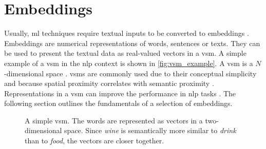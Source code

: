 \section{Embeddings}\label{sec:embeddings}

Usually, \ac{ml} techniques require textual inputs to be converted to embeddings \cite{SentRep2014}.
Embeddings are numerical representations of words, sentences or texts.
They can be used to present the textual data as real-valued vectors in a \ac{vsm}.
A simple example of a \ac{vsm} in the \ac{nlp} context is shown in \autoref{fig:vsm_example}.
A \ac{vsm} is a $N$-dimensional space \cite{soft_cosine2014}.
\acp{vsm} are commonly used due to their conceptual simplicity and because spatial proximity correlates with semantic proximity 
\cite{tfidf2008, UniversalSentEnc2018, HfsentTrans2019, Top2Vec2020}.
Representations in a \ac{vsm} can improve the performance in \ac{nlp} tasks \cite{SkipGram2013}.
The following section outlines the fundamentals of a selection of embeddings.

\begin{figure}[!htb] %
    \centering
    
    \caption[A simple \acs*{vsm}]
    {A simple \acs*{vsm}. 
    The words are represented as vectors in a two-dimensional space.
    Since \textit{wine} is semantically more similar to \textit{drink} than to \textit{food}, the vectors are closer together.
    }
    \label{fig:vsm_example}
\end{figure}












